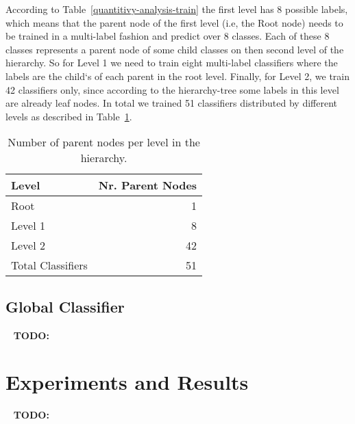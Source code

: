 \documentclass[11pt,a4paper]{article}
\begin{document}
According to Table~\ref{quantitivy-analysis-train} the first level has 8 possible
labels, which means that the parent node of the first level (i.e, the Root node)
needs to be trained in a multi-label fashion and predict over 8 classes. Each of
these 8 classes represents a parent node of some child classes on then
second level of the hierarchy. So for Level 1 we need to train eight multi-label
classifiers where the labels are the child`s of each parent in the root level.
Finally, for Level 2, we train 42 classifiers only, since according to the
hierarchy-tree some labels in this level are already leaf nodes. In total we
trained 51 classifiers distributed by different levels as described in
Table~\ref{parent-per-node-classifiers}.

\begin{table}[!h]
\begin{center}
\begin{tabular}{|l|r|}
\hline\centering\textbf{Level}  &  \textbf{Nr. Parent Nodes}    \\
\hline
Root              &  1       \\
Level 1           &  8       \\
Level 2           &  42      \\
\hline
Total Classifiers & 51       \\
\hline
\end{tabular}
\end{center}
\caption{\label{parent-per-node-classifiers}Number of parent nodes per level in the hierarchy.}
\end{table}

\subsection{Global Classifier}



\ \newline
\textbf{TODO:}
\ \newline







\section{Experiments and Results}\label{experiments}

\ \newline
\textbf{TODO:}
\ \newline
\end{document}
